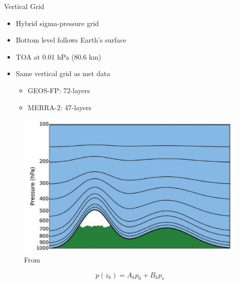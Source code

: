 \documentclass[10pt]{beamer}
\begin{document}
\begin{frame}[fragile]{Vertical Grid}
    \begin{minipage}[c]{0.5\textwidth}
    \begin{itemize}
        \item Hybrid sigma-pressure grid
        \item Bottom level follows Earth's surface
        \item TOA at 0.01 hPa (80.6 km)
        \item Same vertical grid as met data
        \begin{itemize}
            \item GEOS-FP: 72-layers
            \item MERRA-2: 47-layers
        \end{itemize}
    \end{itemize}
    \end{minipage}
    \begin{minipage}[c]{0.49\textwidth}
        \begin{figure}
            \centering
            \includegraphics[width=\textwidth]{hybrid-sigma-pressure.png}
            \captionsetup{labelformat=empty}
            \caption{From \cite{brasseur_modeling_2017}}
        \end{figure}
        $$
            p(z_k) = A_k p_0 + B_k p_s
        $$
    \end{minipage}
\end{frame}
\end{document}
